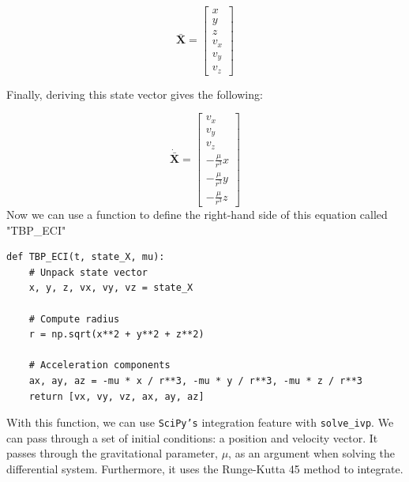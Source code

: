 \documentclass[12pt,twocolumn]{article}  %
\begin{document}
\begin{equation}
    \mathbf{\bar{X}} = 
    \begin{bmatrix}
        x \\
        y \\
        z \\
        v_x \\
        v_y \\
        v_z
        \end{bmatrix}
\end{equation}

Finally, deriving this state vector gives the following:

\begin{equation}
    \mathbf{\dot{\bar{X}}} = 
    \begin{bmatrix}
        v_x \\
        v_y \\
        v_z \\
        -\frac{\mu}{r^3} x \\
        -\frac{\mu}{r^3} y \\
        -\frac{\mu}{r^3} z
        \end{bmatrix}
\end{equation}
Now we can use a function to define 
the right-hand side of this equation called "TBP\_ECI"
\begin{lstlisting}
def TBP_ECI(t, state_X, mu):
    # Unpack state vector
    x, y, z, vx, vy, vz = state_X 

    # Compute radius
    r = np.sqrt(x**2 + y**2 + z**2)  

    # Acceleration components
    ax, ay, az = -mu * x / r**3, -mu * y / r**3, -mu * z / r**3  
    return [vx, vy, vz, ax, ay, az]  
\end{lstlisting}
With this function, we can use \texttt{SciPy's} integration feature with \texttt{solve\_ivp}. We can pass 
through a set of initial conditions: a position and velocity vector. It passes through the 
gravitational parameter, $\mu$, as an argument when solving the differential system. Furthermore, 
it uses the Runge-Kutta 45 method to integrate. 
\end{document}
